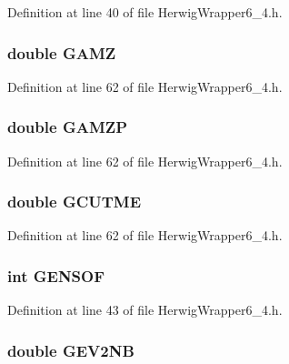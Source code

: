 Definition at line 40 of file Herwig\-Wrapper6\_\-4.h.
\subsubsection{\setlength{\rightskip}{0pt plus 5cm}double {\bf GAMZ}}\label{HerwigWrapper6__4_8h_bf8fe879c1d2cdc99e90b3b5e2a8f6bc}




Definition at line 62 of file Herwig\-Wrapper6\_\-4.h.
\subsubsection{\setlength{\rightskip}{0pt plus 5cm}double {\bf GAMZP}}\label{HerwigWrapper6__4_8h_984cd3227f3cc30b1538dae3b7b09c10}




Definition at line 62 of file Herwig\-Wrapper6\_\-4.h.
\subsubsection{\setlength{\rightskip}{0pt plus 5cm}double {\bf GCUTME}}\label{HerwigWrapper6__4_8h_fe913060f2d008bb70c76b9148259e97}




Definition at line 62 of file Herwig\-Wrapper6\_\-4.h.
\subsubsection{\setlength{\rightskip}{0pt plus 5cm}int {\bf GENSOF}}\label{HerwigWrapper6__4_8h_a0c7052988a8dd0392203ea5deda8d81}




Definition at line 43 of file Herwig\-Wrapper6\_\-4.h.
\subsubsection{\setlength{\rightskip}{0pt plus 5cm}double {\bf GEV2NB}}\label{HerwigWrapper6__4_8h_aae54a2f4cd323c7914d8e856330dfd4}





